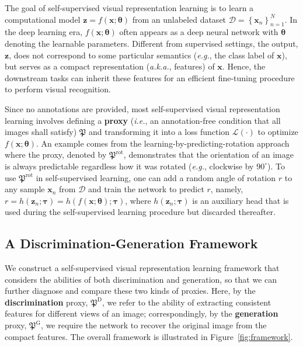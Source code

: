 \documentclass[10pt,twocolumn,letterpaper]{article}
\begin{document}
The goal of self-supervised visual representation learning is to learn a computational model $\mathbf{z}=f(\mathbf{x};\boldsymbol{\theta})$ from an unlabeled dataset $\mathcal{D}=\left\{\mathbf{x}_n\right\}_{n=1}^N$. In the deep learning era, $f(\mathbf{x};\boldsymbol{\theta})$ often appears as a deep neural network with $\boldsymbol{\theta}$ denoting the learnable parameters. Different from supervised settings, the output, $\mathbf{z}$, does not correspond to some particular semantics (\textit{e.g.}, the class label of $\mathbf{x}$), but serves as a compact representation (\textit{a.k.a.}, features) of $\mathbf{x}$. Hence, the downstream tasks can inherit these features for an efficient fine-tuning procedure to perform visual recognition.

Since no annotations are provided, most self-supervised visual representation learning involves defining a \textbf{proxy} (\textit{i.e.}, an annotation-free condition that all images shall satisfy) $\mathfrak{P}$ and transforming it into a loss function $\mathcal{L}(\cdot)$ to optimize $f(\mathbf{x};\boldsymbol{\theta})$. An example comes from the learning-by-predicting-rotation approach~\cite{rotation} where the proxy, denoted by $\mathfrak{P}^\mathrm{rot}$, demonstrates that the orientation of an image is always predictable regardless how it was rotated (\textit{e.g.}, clockwise by $90^\circ$). To use $\mathfrak{P}^\mathrm{rot}$ in self-supervised learning, one can add a random angle of rotation $r$ to any sample $\mathbf{x}_n$ from $\mathcal{D}$ and train the network to predict $r$, namely, $r=h(\mathbf{z}_n;\boldsymbol{\tau})=h(f(\mathbf{x};\boldsymbol{\theta});\boldsymbol{\tau})$, where $h(\mathbf{z}_n;\boldsymbol{\tau})$ is an auxiliary head that is used during the self-supervised learning procedure but discarded thereafter.

\subsection{A Discrimination-Generation Framework}
\label{approach:framework}

We construct a self-supervised visual representation learning framework that considers the abilities of both discrimination and generation, so that we can further diagnose and compare these two kinds of proxies. Here, by the \textbf{discrimination} proxy, $\mathfrak{P}^\mathrm{D}$, we refer to the ability of extracting consistent features for different views of an image; correspondingly, by the \textbf{generation} proxy, $\mathfrak{P}^\mathrm{G}$, we require the network to recover the original image from the compact features. The overall framework is illustrated in Figure~\ref{fig:framework}.
\end{document}
